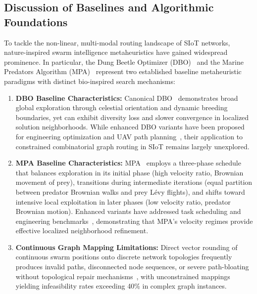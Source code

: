 \documentclass[journal,compsoc]{IEEEtran}
\begin{document}
\subsection{Discussion of Baselines and Algorithmic Foundations}
To tackle the non-linear, multi-modal routing landscape of SIoT networks, nature-inspired swarm intelligence metaheuristics have gained widespread prominence. In particular, the Dung Beetle Optimizer (DBO)~\cite{xue2022dung} and the Marine Predators Algorithm (MPA)~\cite{faramarzi2020marine} represent two established baseline metaheuristic paradigms with distinct bio-inspired search mechanisms:
\begin{enumerate}
    \item \textbf{DBO Baseline Characteristics:} Canonical DBO~\cite{xue2022dung} demonstrates broad global exploration through celestial orientation and dynamic breeding boundaries, yet can exhibit diversity loss and slower convergence in localized solution neighborhoods. While enhanced DBO variants have been proposed for engineering optimization and UAV path planning~\cite{wu2023energy, li2024enhanced, lyu2024improved, ye2024multi, mao2025multi, yu2025multi}, their application to constrained combinatorial graph routing in SIoT remains largely unexplored.
    \item \textbf{MPA Baseline Characteristics:} MPA~\cite{faramarzi2020marine} employs a three-phase schedule that balances exploration in its initial phase (high velocity ratio, Brownian movement of prey), transitions during intermediate iterations (equal partition between predator Brownian walks and prey L\'evy flights), and shifts toward intensive local exploitation in later phases (low velocity ratio, predator Brownian motion). Enhanced variants have addressed task scheduling and engineering benchmarks~\cite{abdelbasset2021multi, abdollahzadeh2021hybrid, ma2022modified}, demonstrating that MPA's velocity regimes provide effective localized neighborhood refinement.
    \item \textbf{Continuous Graph Mapping Limitations:} Direct vector rounding of continuous swarm positions onto discrete network topologies frequently produces invalid paths, disconnected node sequences, or severe path-bloating without topological repair mechanisms~\cite{wu2023energy, liu2024discrete}, with unconstrained mappings yielding infeasibility rates exceeding 40\% in complex graph instances.
\end{enumerate}
\end{document}
